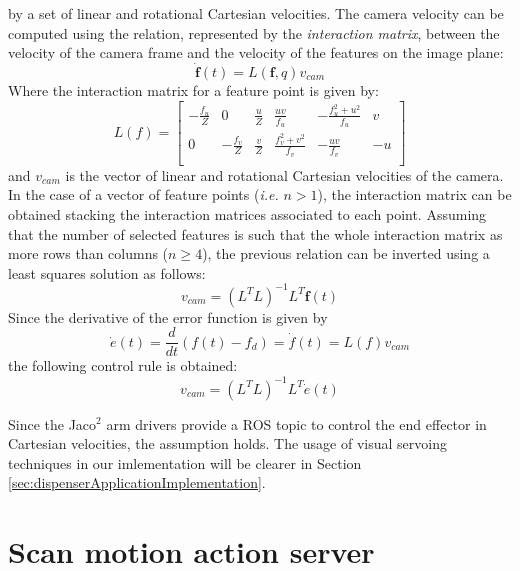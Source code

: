 by a set of linear and rotational Cartesian velocities.
The camera velocity can be computed using the relation, represented by the
\textit{interaction matrix}, between the velocity of the camera frame and the velocity of the features on the image plane:
\[
\dot{\boldsymbol{f}}(t) = L(\boldsymbol{f},q)v_{cam}
\]
Where the interaction matrix for a feature point is given by:
\[
L(f)=
\begin{bmatrix}
-\frac{f_u}{Z}	& 0 				& \frac{u}{Z}	& \frac{uv}{f_u} 		& -\frac{f_u^2+u^2}{f_u} & v \\
0			& -\frac{f_v}{Z}	& \frac{v}{Z}	& \frac{f_v^2+v^2}{f_v} &  -\frac{uv}{f_v} & -u\\
\end{bmatrix}
\]
and $v_{cam}$ is the vector of linear and rotational Cartesian velocities of the camera. In the case of a vector of feature points (\textit{i.e.} $n>1$), the interaction matrix can be obtained stacking the interaction matrices associated to each point.
Assuming that the number of selected features is such that the whole interaction matrix as
more rows than columns ($n\geq4$), the previous relation can be inverted using a least squares solution as follows:
\begin{equation}
	v_{cam}=(L^TL)^{-1}L^T\dot{\boldsymbol{f}}(t)
\end{equation}
Since the derivative of the error function is given by 
\[
	\dot{e}(t)=\frac{d}{dt}(f(t)-f_d) = \dot{f}(t) = L(f)v_{cam}
\]
the following control rule is obtained:
\[
v_{cam}=(L^TL)^{-1}L^T\dot{e}(t)
\]

Since the Jaco$^2$ arm drivers provide a \ac{ROS} topic to control the end effector in Cartesian velocities, the assumption holds. The usage of visual servoing techniques in our imlementation will be clearer in Section \ref{sec:dispenserApplicationImplementation}.

\section{Scan motion action server}\label{sec:scanMotionActionServer}

